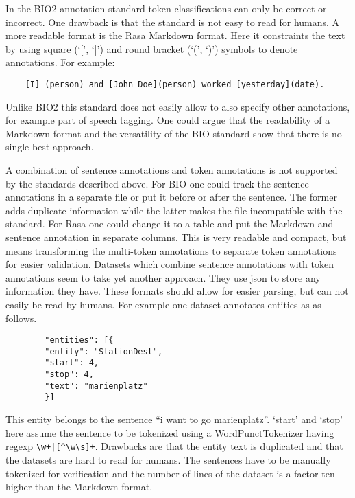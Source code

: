 In the BIO2 annotation standard token classifications can only be correct or incorrect.
One drawback is that the standard is not easy to read for humans.
A more readable format is the Rasa Markdown format.
Here it constraints the text by using square (`[', `]') and round bracket (`(', `)') symbols to denote annotations.
For example:
\begin{center}
    \begin{verbatim}
    [I] (person) and [John Doe](person) worked [yesterday](date).
    \end{verbatim}
\end{center}
Unlike BIO2 this standard does not easily allow to also specify other annotations, for example part of speech tagging.
One could argue that the readability of a Markdown format and the versatility of the BIO standard show that there is no single best approach.

A combination of sentence annotations and token annotations is not supported by the standards described above.
For BIO one could track the sentence annotations in a separate file or put it before or after the sentence.
The former adds duplicate information while the latter makes the file incompatible with the standard.
For Rasa one could change it to a table and put the Markdown and sentence annotation in separate columns.
This is very readable and compact, but means transforming the multi-token annotations to separate token annotations for easier validation.
Datasets which combine sentence annotations with token annotations seem to take yet another approach.
They use json to store any information they have.
These formats should allow for easier parsing, but can not easily be read by humans.
For example one dataset annotates entities as as follows.
\begin{center}
    \begin{verbatim}
        "entities": [{
        "entity": "StationDest",
        "start": 4,
        "stop": 4,
        "text": "marienplatz"
        }]
    \end{verbatim}
\end{center}
This entity belongs to the sentence ``i want to go marienplatz''.
`start' and `stop' here assume the sentence to be tokenized using a WordPunctTokenizer having regexp \verb/\w+|[^\w\s]+/.
Drawbacks are that the entity text is duplicated and that the datasets are hard to read for humans.
The sentences have to be manually tokenized for verification and the number of lines of the dataset is a factor ten higher than the Markdown format.

